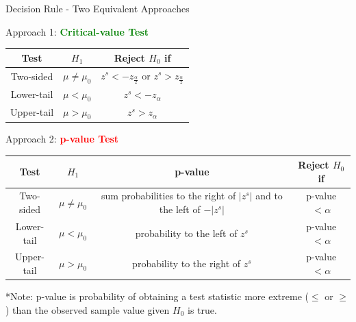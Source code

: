 \documentclass[
  10pt,
  ignorenonframetext,
]{beamer}
\begin{document}
\begin{frame}{Decision Rule - Two Equivalent Approaches}
\protect\hypertarget{decision-rule---two-equivalent-approaches-1}{}
\begin{center}
Approach 1: \textcolor{green}{\textbf{Critical-value Test}}\\
\vspace{3mm}
\begin{tabular}{|c|c|c|}
\hline
Test & $H_1$ & Reject $H_0$ if\\
\hline
Two-sided &  $\mu \neq \mu_{0}$ & $z^s < -z_{\frac{\alpha}{2}}$ or $ z^s> z_{\frac{\alpha}{2}}$\\
\hline 
Lower-tail & $\mu < \mu_{0}$ & $z^s < - z_{\alpha}$\\ 
\hline 
Upper-tail & $\mu > \mu_{0}$ & $z^s > z_{\alpha}$\\ 
\hline
\end{tabular}
\end{center}

\vspace{3mm}

\begin{center}
Approach 2: \textcolor{red}{\textbf{p-value Test}}\\
\vspace{3mm}
\begin{tabular}{|c|c|c|c|}
\hline
Test & $H_1$ & p-value & Reject $H_0$ if\\
\hline
Two-sided &  $\mu \neq \mu_{0}$ & \makecell{sum probabilities to the right \\ of $|z^s|$ and to the left of $-|z^s|$} & p-value $< \alpha$\\
    \hline 
Lower-tail & $\mu < \mu_{0}$ & probability to the left of $z^s$ & p-value $< \alpha$\\ 
\hline 
Upper-tail & $\mu > \mu_{0}$ & probability to the right of $z^s$ & p-value $<\alpha$\\ 
\hline
\end{tabular}
    
\vspace{1mm}
 
 \footnotesize   
*Note: p-value is probability of obtaining a test statistic more extreme ($\leq$ or $\geq$) than the observed sample value given $H_0$ is true.
\end{center}
\end{frame}
\end{document}

